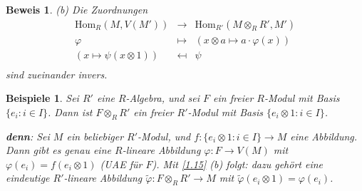 \documentclass[a4paper,12pt]{scrbook}
\theoremstyle{break}
\theoremstyle{nonumberbreak}
\newtheorem{Bew}{Beweis}
\newtheorem{nnBsp}{Beispiele}
\theoremstyle{nonumberplain}
\begin{document}
\begin{Bew}
\item[(b)] Die Zuordnungen $$\begin{array}{rcl}
    \textrm{Hom}_R(M, V(M')) & \to & \textrm{Hom}_{R'}(M\otimes_R R', M')\\
                     \varphi & \mapsto & (x\otimes a\mapsto a\cdot \varphi(x))\\
    (x\mapsto \psi(x\otimes 1))&\mapsfrom & \psi \\
  \end{array}$$
  sind zueinander invers.
\end{Bew}

\begin{nnBsp}
  Sei $R'$ eine $R$-Algebra, und sei $F$ ein freier $R$-Modul mit Basis $\{e_i:i\in I\}$. Dann ist
  $F\otimes_R R'$ ein freier $R'$-Modul mit Basis $\{e_i\otimes 1:i\in I\}$.

  \textbf{denn}: Sei $M$ ein beliebiger $R'$-Modul, und $f:\{e_i\otimes 1: i\in I\} \to M$ eine
  Abbildung.
  Dann gibt es genau eine $R$-lineare Abbildung $\varphi: F\to V(M)$ mit $\varphi(e_i)=f(e_i\otimes 1)$ (UAE für $F$).
  Mit \ref{1.15} (b) folgt: dazu gehört eine eindeutige $R'$-lineare Abbildung
  $\tilde\varphi: F\otimes_R R'\to M$ mit $\tilde\varphi(e_i\otimes 1)=\varphi(e_i)$.
\end{nnBsp}
\end{document}
